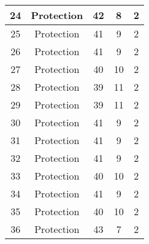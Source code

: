 \documentclass[results.tex]{subfiles}
\begin{document}
\begin{center}
\begin{tabular}{| c || c | c | c | c |}
            \hline
            24                      & Protection                   & 42                     & 8                       & 2                    \\
            \hline
            25                      & Protection                   & 41                     & 9                       & 2                    \\
            \hline
            26                      & Protection                   & 41                     & 9                       & 2                    \\
            \hline
            27                      & Protection                   & 40                     & 10                      & 2                    \\
            \hline
            28                      & Protection                   & 39                     & 11                      & 2                    \\
            \hline
            29                      & Protection                   & 39                     & 11                      & 2                    \\
            \hline
            30                      & Protection                   & 41                     & 9                       & 2                    \\
            \hline
            31                      & Protection                   & 41                     & 9                       & 2                    \\
            \hline
            32                      & Protection                   & 41                     & 9                       & 2                    \\
            \hline
            33                      & Protection                   & 40                     & 10                      & 2                    \\
            \hline
            34                      & Protection                   & 41                     & 9                       & 2                    \\
            \hline
            35                      & Protection                   & 40                     & 10                      & 2                    \\
            \hline
            36                      & Protection                   & 43                     & 7                       & 2                    \\

\end{tabular}
\end{center}
\end{document}
